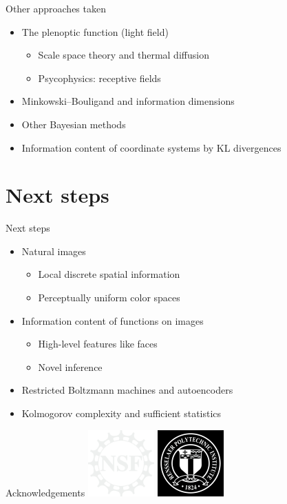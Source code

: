 \documentclass[14pt,c]{beamer}
\begin{document}
\begin{frame}{Other approaches taken}
  \begin{itemize}
    \item The plenoptic function (light field)
      \begin{itemize}
        \item Scale space theory and thermal diffusion
        \item Psycophysics: receptive fields
      \end{itemize}
    \item Minkowski–Bouligand and information dimensions
    \item Other Bayesian methods
    \item Information content of coordinate systems by KL divergences
  \end{itemize}
\end{frame}

\section{Next steps}

\begin{frame}{Next steps}
  \begin{itemize}
    \item Natural images
      \begin{itemize}
        \item Local discrete spatial information
        \item Perceptually uniform color spaces
      \end{itemize}
    \item Information content of functions on images
      \begin{itemize}
        \item High-level features like faces
        \item Novel inference
      \end{itemize}
    \item Restricted Boltzmann machines and autoencoders
    \item Kolmogorov complexity and sufficient statistics
  \end{itemize}
\end{frame}

\begin{frame}{Acknowledgements}
  \centering
  \includegraphics[width=1in]{nsf}
  \quad
  \includegraphics[width=1in]{rpi}
\end{frame}
\end{document}
